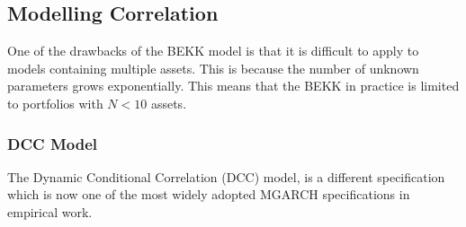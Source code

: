 \documentclass[11pt]{article}
\begin{document}
\subsection{Modelling Correlation}

One of the drawbacks of the BEKK model is that it is difficult to apply to models containing multiple assets. This is because the number of unknown parameters grows exponentially. This means that the BEKK in practice is limited to portfolios with $N<10$ assets.

\subsubsection{DCC Model}

The Dynamic Conditional Correlation (DCC) model, is a different specification which is now one of the most widely adopted MGARCH specifications in empirical work.
\end{document}

